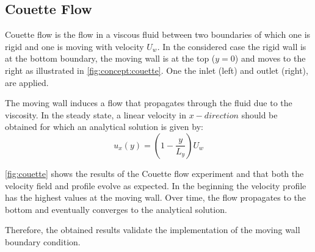\subsection{Couette Flow}

Couette flow is the flow in a viscous fluid between two boundaries of which one is rigid and one is moving with velocity $U_w$. In the considered case the rigid wall is at the bottom boundary, the moving wall is at the top ($y=0$) and moves to the right as illustrated in \cref{fig:concept:couette}. One the inlet (left) and outlet (right),  are applied.

The moving wall induces a flow that propagates through the fluid due to the viscosity. In the steady state, a linear velocity in $x-direction$ should be obtained for which an analytical solution is given by:
\begin{equation}
    u_x(y) = \left(1-\frac{y}{L_y}\right) U_w
    \label{eq:couette:analytical-solution}
\end{equation}

\cref{fig:couette} shows the results of the Couette flow experiment and that both the velocity field and profile evolve as expected. In the beginning the velocity profile has the highest values at the moving wall. Over time, the flow propagates to the bottom and eventually converges to the analytical solution.

Therefore, the obtained results validate the implementation of the moving wall boundary condition.

